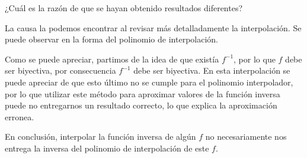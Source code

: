 \documentclass[spanish, fleqn]{article}
\begin{document}
\begin{enumerate}
  
  ¿Cuál es la razón de que  se hayan obtenido resultados diferentes?
  
   La causa la podemos encontrar al revisar más detalladamente la interpolación. Se puede observar en la forma del polinomio de interpolación.
     
  Como se puede apreciar, partimos de la idea de que existía $f^{-1}$, por lo que $f$ debe ser biyectiva, por consecuencia $f^{-1}$ debe ser biyectiva. En esta interpolación se puede apreciar de que esto último no se cumple para el polinomio interpolador, por lo que utilizar este método para aproximar valores de la función inversa puede no entregarnos un resultado correcto, lo que explica la aproximación erronea.
  
   En conclusión, interpolar la función inversa de algún $f$ no necesariamente nos entrega la inversa del polinomio de interpolación de este $f$.
  \end{enumerate}
\end{document}
